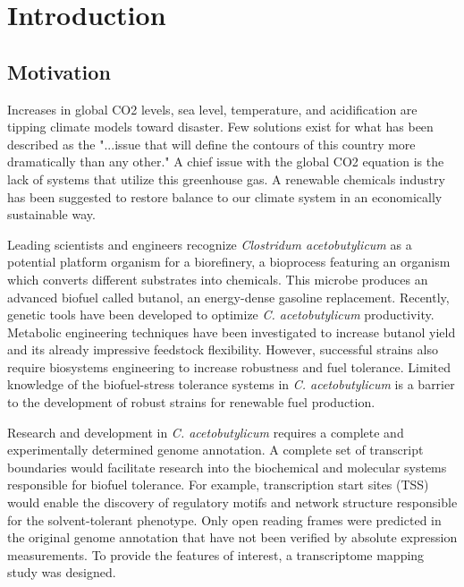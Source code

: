 %
%
\chapter{Introduction}
\section{Motivation}
Increases in global CO2 levels, sea level, temperature, and acidification are tipping climate models toward disaster.\cite{95} Few solutions exist for what has been described as the "...issue that will define the contours of this country more dramatically than any other."\cite{61} A chief issue with the global CO2 equation is the lack of systems that utilize this greenhouse gas. A renewable chemicals industry has been suggested to restore balance to our climate system in an economically sustainable way.

Leading scientists and engineers\cite{3,4,16,24,26} recognize \textit{Clostridum acetobutylicum} as a potential platform organism for a biorefinery, a bioprocess featuring an organism which converts different substrates into chemicals. This microbe produces an advanced biofuel called butanol, an energy-dense gasoline replacement. Recently, genetic tools have been developed to optimize \textit{C. acetobutylicum} productivity.\cite{96,97,98} Metabolic engineering techniques have been investigated\cite{99,100} to increase butanol yield and its already impressive feedstock flexibility.\cite{101,102} However, successful strains also require biosystems engineering to increase robustness and fuel tolerance.\cite{1,6,101,103} Limited knowledge of the biofuel-stress tolerance systems in \textit{C. acetobutylicum} is a barrier to the development of robust strains for renewable fuel production.

Research and development in \textit{C. acetobutylicum} requires a complete and experimentally determined genome annotation. A complete set of transcript boundaries would facilitate research into the biochemical and molecular systems responsible for biofuel tolerance. For example, transcription start sites (TSS) would enable the discovery of regulatory motifs and network structure responsible for the solvent-tolerant phenotype.\cite{104,105,106,107} Only open reading frames were predicted in the original genome annotation that have not been verified by absolute expression measurements.\cite{91} To provide the features of interest, a transcriptome mapping study was designed.

